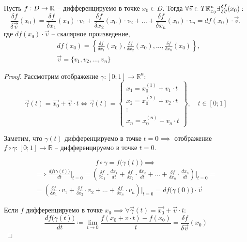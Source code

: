 \begin{statement}
    Пусть $ f:D\rightarrow\mathbb{R} $ -- дифференцируемо в точке $ x_0\in D $. Тогда $ \forall \vec{v}\in T\mathbb{R}_{x_0}^n \exists \frac{\delta f}{\delta \vec{v}}(x_0):$
    \[
        \frac{\delta f}{\delta \vec{v}}(x_0) = \frac{\delta f}{\delta x_1}(x_0) \cdot v_1 + \frac{\delta f}{\delta x_2}(x_0) \cdot v_2 + \ldots +\frac{\delta f}{\delta x_n}(x_0) \cdot v_n = df(x_0)\cdot \vec{v},
    \] где $df(x_0)\cdot \vec{v}$ -- скалярное произведение,
    \begin{align*}
         & df(x_0) = \left\{\frac{\delta f}{\delta x_1}(x_0), \frac{\delta f}{\delta x_2}(x_0), \ldots, \frac{\delta f}{\delta x_n}(x_0)\right\}, \\
         & \vec{v} = \{v_1,v_2,\ldots,v_n\}
    \end{align*}
\end{statement}
\begin{proof}
    Рассмотрим отображение $\gamma:[0;1]\rightarrow \mathbb{R}^n$:
    \[
        \vec{\gamma}(t) = \vec{x_0} + \vec{v}\cdot t \iff \vec{\gamma}(t) = \left\{\begin{array}{l}
            x_1 = x_0^{(1)} + v_1 \cdot t \\
            x_2 = x_0^{(2)} + v_2 \cdot t \\
            \vdots                        \\
            x_n = x_0^{(n)} + v_n \cdot t
        \end{array}\right\}, \quad t \in [0;1]
    \]

    Заметим, что $\gamma(t)$ дифференцируемо в точке $t = 0 \implies$ отображение $f \circ \gamma:[0;1]\rightarrow\mathbb{R}$ -- дифференцируемо в точке $t = 0$.

    \[
        f\circ\gamma = f\big(\gamma(t)\big) \implies
    \]
    \begin{multline*}
        \implies \frac{df\big(\gamma(t)\big)}{dt}\bigg|_{t=0} = \left(\frac{\delta f}{\delta x_1} \cdot \frac{d x_1}{dt} + \frac{\delta f}{\delta x_2}\cdot\frac{dx_2}{dt} + \ldots + \frac{\delta f}{\delta x_n}\cdot\frac{dx_n}{dt}\right)\bigg|_{t=0} = \\
        = \left(\frac{\delta f}{\delta x_1} \cdot v_1 + \frac{\delta f}{\delta x_2} \cdot v_2 + \ldots + \frac{\delta f}{\delta x_n} \cdot v_n\right)\bigg|_{t=0} = df\big(\gamma(0)\big)\cdot \vec{v}
    \end{multline*}

    Если $f$ дифференцируемо в точке $x_0 \implies \forall \vec{\gamma}(t) = \vec{x_0} + \vec{v}\cdot t$:
    \[
        \frac{df\big(\gamma(t)\big)}{dt} \coloneqq \underset{t\rightarrow0}{\lim}\frac{f(x_0 + v\cdot t) - f(x_0)}{t} = \frac{\delta f}{\delta \vec{v}}(x_0)
    \]
\end{proof}

